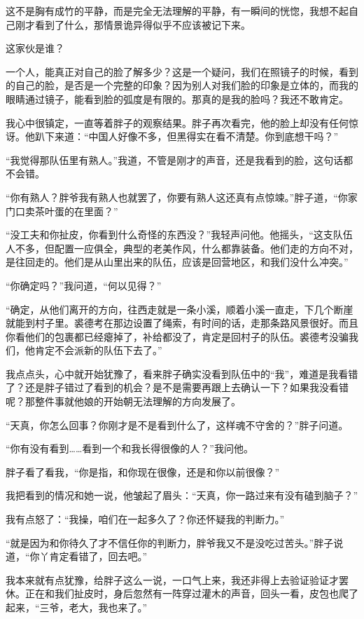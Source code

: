 这不是胸有成竹的平静，而是完全无法理解的平静，有一瞬间的恍惚，我想不起自己刚才看到了什么，那情景诡异得似乎不应该被记下来。

这家伙是谁？

一个人，能真正对自己的脸了解多少？这是一个疑问，我们在照镜子的时候，看到的自己的脸，是否是一个完整的印象？因为别人对我们脸的印象是立体的，而我的眼睛通过镜子，能看到脸的弧度是有限的。那真的是我的脸吗？我还不敢肯定。

我心中很镇定，一直等着胖子的观察结果。胖子再次看完，他的脸上却没有任何惊讶。他趴下来道：“中国人好像不多，但黑得实在看不清楚。你到底想干吗？”

“我觉得那队伍里有熟人。”我道，不管是刚才的声音，还是我看到的脸，这句话都不会错。

“你有熟人？胖爷我有熟人也就罢了，你要有熟人这还真有点惊竦。”胖子道，“你家门口卖茶叶蛋的在里面？”

“没工夫和你扯皮，你看到什么奇怪的东西没？”我轻声问他。他摇头，“这支队伍人不多，但配置一应俱全，典型的老美作风，什么都靠装备。他们走的方向不对，是往回走的。他们是从山里出来的队伍，应该是回营地区，和我们没什么冲突。”

“你确定吗？”我问道，“何以见得？”

“确定，从他们离开的方向，往西走就是一条小溪，顺着小溪一直走，下几个断崖就能到村子里。裘德考在那边设置了绳索，有时间的话，走那条路风景很好。而且你看他们的包裹都已经瘪掉了，补给都没了，肯定是回村子的队伍。裘德考没骗我们，他肯定不会派新的队伍下去了。”

我点点头，心中就开始犹豫了，看来胖子确实没看到队伍中的“我”，难道是我看错了？还是胖子错过了看到的机会？是不是需要再跟上去确认一下？如果我没看错呢？那整件事就他娘的开始朝无法理解的方向发展了。

“天真，你怎么回事？你刚才是不是看到什么了，这样魂不守舍的？”胖子问道。

“你有没有看到……看到一个和我长得很像的人？”我问他。

胖子看了看我，“你是指，和你现在很像，还是和你以前很像？”

我把看到的情况和她一说，他皱起了眉头：“天真，你一路过来有没有磕到脑子？”

我有点怒了：“我操，咱们在一起多久了？你还怀疑我的判断力。”

“就是因为和你待久了才不信任你的判断力，胖爷我又不是没吃过苦头。”胖子说道，“你丫肯定看错了，回去吧。”

我本来就有点犹豫，给胖子这么一说，一口气上来，我还非得上去验证验证才罢休。正在和我们扯皮时，身后忽然有一阵穿过灌木的声音，回头一看，皮包也爬了起来，“三爷，老大，我也来了。”

